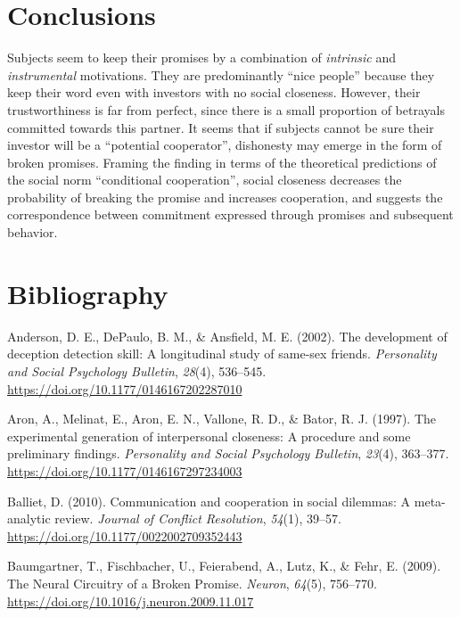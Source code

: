 \documentclass[12pt,]{article}
\begin{document}
\hypertarget{conclusions}{%
\section{Conclusions}\label{conclusions}}

Subjects seem to keep their promises by a combination of
\emph{intrinsic} and \emph{instrumental} motivations. They are
predominantly ``nice people'' because they keep their word even with
investors with no social closeness. However, their trustworthiness is
far from perfect, since there is a small proportion of betrayals
committed towards this partner. It seems that if subjects cannot be sure
their investor will be a ``potential cooperator'', dishonesty may emerge
in the form of broken promises. Framing the finding in terms of the
theoretical predictions of the social norm ``conditional cooperation'',
social closeness decreases the probability of breaking the promise and
increases cooperation, and suggests the correspondence between
commitment expressed through promises and subsequent behavior.

\hypertarget{bibliography}{%
\section*{Bibliography}\label{bibliography}}

\hypertarget{refs}{}
\leavevmode\hypertarget{ref-Anderson2002}{}%
Anderson, D. E., DePaulo, B. M., \& Ansfield, M. E. (2002). The
development of deception detection skill: A longitudinal study of
same-sex friends. \emph{Personality and Social Psychology Bulletin},
\emph{28}(4), 536--545. \url{https://doi.org/10.1177/0146167202287010}

\leavevmode\hypertarget{ref-Aron1997}{}%
Aron, A., Melinat, E., Aron, E. N., Vallone, R. D., \& Bator, R. J.
(1997). The experimental generation of interpersonal closeness: A
procedure and some preliminary findings. \emph{Personality and Social
Psychology Bulletin}, \emph{23}(4), 363--377.
\url{https://doi.org/10.1177/0146167297234003}

\leavevmode\hypertarget{ref-Balliet2010}{}%
Balliet, D. (2010). Communication and cooperation in social dilemmas: A
meta-analytic review. \emph{Journal of Conflict Resolution},
\emph{54}(1), 39--57. \url{https://doi.org/10.1177/0022002709352443}

\leavevmode\hypertarget{ref-Baumgartner2009}{}%
Baumgartner, T., Fischbacher, U., Feierabend, A., Lutz, K., \& Fehr, E.
(2009). The Neural Circuitry of a Broken Promise. \emph{Neuron},
\emph{64}(5), 756--770.
\url{https://doi.org/10.1016/j.neuron.2009.11.017}
\end{document}
